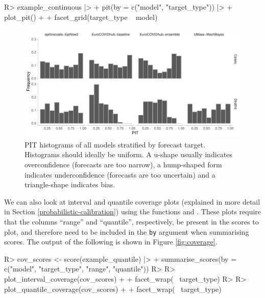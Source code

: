\documentclass[
]{jss}
\begin{document}
\begin{CodeChunk}
\begin{CodeInput}
R> example_continuous |>
+   pit(by = c("model", "target_type")) |>
+   plot_pit() +
+   facet_grid(target_type ~ model)
\end{CodeInput}
\begin{figure}[!h]

{\centering \includegraphics[width=1\linewidth]{manuscript_files/figure-latex/pit-plots-1}

}

\caption[PIT histograms of all models stratified by forecast target]{PIT histograms of all models stratified by forecast target. Histograms should ideally be uniform. A u-shape usually indicates overconfidence (forecasts are too narrow), a hump-shaped form indicates underconfidence (forecasts are too uncertain) and a triangle-shape indicates bias.}\label{fig:pit-plots}
\end{figure}
\end{CodeChunk}

We can also look at interval and quantile coverage plots (explained in
more detail in Section \ref{probabilistic-calibration}) using the
functions  and
. These plots require that the columns
``range'' and ``quantile'', respectively, be present in the scores to
plot, and therefore need to be included in the \texttt{by} argument when
summarising scores. The output of the following is shown in Figure
\ref{fig:coverage}.

\begin{CodeChunk}
\begin{CodeInput}
R> cov_scores <- score(example_quantile) |>
+   summarise_scores(by = c("model", "target_type", "range", "quantile"))
R>
R> plot_interval_coverage(cov_scores) +
+   facet_wrap(~ target_type)
R>
R> plot_quantile_coverage(cov_scores) +
+   facet_wrap(~ target_type)
\end{CodeInput}
\end{CodeChunk}
\end{document}
